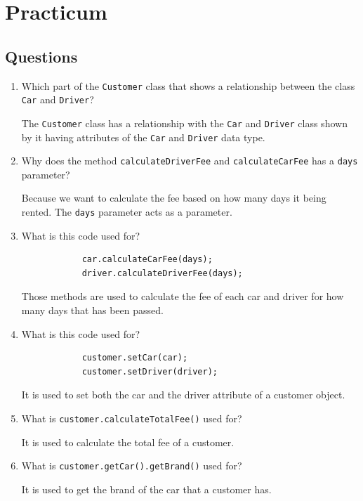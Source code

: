 \documentclass[12pt,titlepage]{article}
\begin{document}
\pagebreak

\section{Practicum}
\subsection{Questions}
\begin{enumerate}
    \item {
        Which part of the \texttt{Customer} class that shows a relationship between the class \texttt{Car} and \texttt{Driver}?

        The \texttt{Customer} class has a relationship with the \texttt{Car} and \texttt{Driver} class shown by it having
        attributes of the \texttt{Car} and \texttt{Driver} data type.
    }
    \item {
        Why does the method \texttt{calculateDriverFee} and \texttt{calculateCarFee} has a \texttt{days}
        parameter?

        Because we want to calculate the fee based on how many days it being rented. The \texttt{days} parameter
        acts as a parameter.
    }
    \item {
        What is this code used for?

        \begin{verbatim}
            car.calculateCarFee(days);
            driver.calculateDriverFee(days);
        \end{verbatim}

        Those methods are used to calculate the fee of each car and driver for how many days that has been passed.
    }
    \item {
        What is this code used for?

        \begin{verbatim}
            customer.setCar(car);
            customer.setDriver(driver);
        \end{verbatim}

        It is used to set both the car and the driver attribute of a customer object.
    }
    \item {
        What is \texttt{customer.calculateTotalFee()} used for?

        It is used to calculate the total fee of a customer.
    }
    \item {
        What is \texttt{customer.getCar().getBrand()} used for?

        It is used to get the brand of the car that a customer has.
    }
\end{enumerate}
\end{document}
